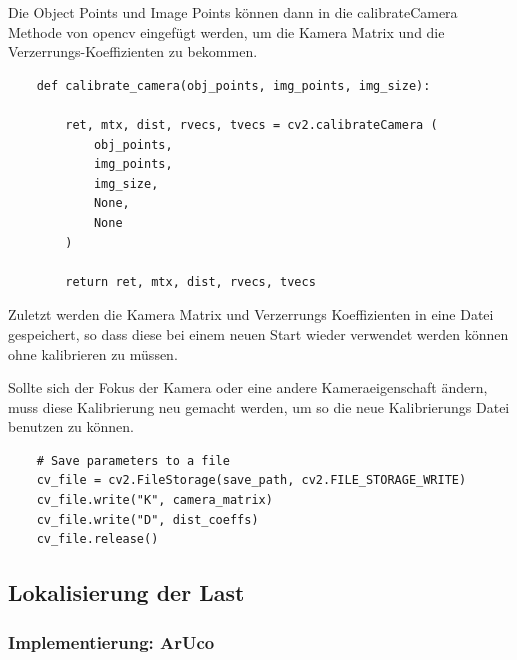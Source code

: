 Die Object Points und Image Points können dann in die calibrateCamera Methode von opencv eingefügt 
werden, um die Kamera Matrix und die Verzerrungs-Koeffizienten zu bekommen.



\begin{lstlisting}
    def calibrate_camera(obj_points, img_points, img_size):

        ret, mtx, dist, rvecs, tvecs = cv2.calibrateCamera (
            obj_points, 
            img_points, 
            img_size, 
            None, 
            None
        )

        return ret, mtx, dist, rvecs, tvecs
\end{lstlisting}


Zuletzt werden die Kamera Matrix und Verzerrungs Koeffizienten in eine Datei gespeichert, so dass 
diese bei einem neuen Start wieder verwendet werden können ohne kalibrieren zu müssen.

Sollte sich der Fokus der Kamera oder eine andere Kameraeigenschaft ändern,
muss diese Kalibrierung neu gemacht werden, um so die neue Kalibrierungs Datei benutzen zu können.


\begin{lstlisting}
    # Save parameters to a file
    cv_file = cv2.FileStorage(save_path, cv2.FILE_STORAGE_WRITE)
    cv_file.write("K", camera_matrix)
    cv_file.write("D", dist_coeffs)
    cv_file.release()
\end{lstlisting}

\clearpage

\subsection{Lokalisierung der Last}

\subsubsection{Implementierung: ArUco}

